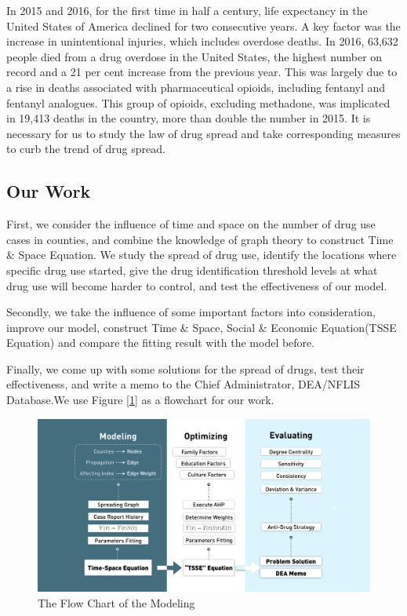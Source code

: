 \documentclass{mcmthesis}
\begin{document}
In 2015 and 2016, for the first time in half a century, life expectancy in the United States of America declined for two consecutive years. A key factor was the increase in unintentional injuries, which includes overdose deaths. In 2016, 63,632 people died from a drug overdose in the United States, the highest number on record and a 21 per cent increase from the previous year. This was largely due to a rise in deaths associated with pharmaceutical opioids, including fentanyl and fentanyl analogues. This group of opioids, excluding methadone, was implicated in 19,413 deaths in the country, more than double the number in 2015. It is necessary for us to study the law of drug spread and take corresponding measures to curb the trend of drug spread.\cite{1}

\subsection{Our Work}
First, we consider the influence of time and space on the number of drug use cases in counties, and combine the knowledge of graph theory to construct Time \& Space Equation. We study the spread of drug use, identify the locations where specific drug use started, give the drug identification threshold levels at what drug use will become harder to control, and test the effectiveness of our model.

Secondly, we take the influence of some important  factors into consideration, improve our model, construct Time \& Space, Social \& Economic Equation(TSSE Equation) and compare the fitting result with the model before.

Finally, we come up with some solutions for the spread of drugs, test their effectiveness, and write a memo to the Chief Administrator, DEA/NFLIS Database.We use Figure [\ref{all_flowmap}] as a flowchart for our work.
\begin{figure}[h]
	\centering
	\includegraphics[width=15cm]{figure-release/ProgressMap.png}
	\caption{The Flow Chart of the Modeling}\label{all_flowmap}
\end{figure}
\end{document}
